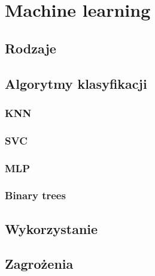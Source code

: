 \chapter{Machine learning}
\section{Rodzaje}
\section{Algorytmy klasyfikacji}
\subsection{KNN}
\subsection{SVC}
\subsection{MLP}
\subsection{Binary trees}
\section{Wykorzystanie}
\section{Zagrożenia}


